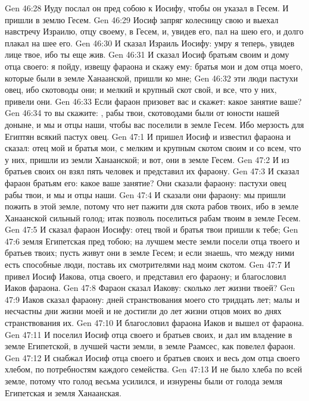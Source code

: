 \vs Gen 46:28 Иуду послал он пред собою к Иосифу, чтобы он указал  в Гесем. И пришли в землю Гесем.
\vs Gen 46:29 Иосиф запряг колесницу свою и выехал навстречу Израилю, отцу своему, в Гесем, и, увидев его, пал на шею его, и долго плакал на шее его.
\vs Gen 46:30 И сказал Израиль Иосифу: умру я теперь, увидев лице твое, ибо ты еще жив.
\vs Gen 46:31 И сказал Иосиф братьям своим и дому отца своего: я пойду, извещу фараона и скажу ему: братья мои и дом отца моего, которые были в земле Ханаанской, пришли ко мне;
\vs Gen 46:32 эти люди пастухи овец, ибо скотоводы они; и мелкий и крупный скот свой, и все, что у них, привели они.
\vs Gen 46:33 Если фараон призовет вас и скажет: какое занятие ваше?
\vs Gen 46:34 то вы скажите: , рабы твои, скотоводами были от юности нашей доныне, и мы и отцы наши, чтобы вас поселили в земле Гесем. Ибо мерзость для Египтян всякий пастух овец.
\vs Gen 47:1 И пришел Иосиф и известил фараона и сказал: отец мой и братья мои, с мелким и крупным скотом своим и со всем, что у них, пришли из земли Ханаанской; и вот, они в земле Гесем.
\vs Gen 47:2 И из братьев своих он взял пять человек и представил их фараону.
\vs Gen 47:3 И сказал фараон братьям его: какое ваше занятие? Они сказали фараону: пастухи овец рабы твои, и мы и отцы наши.
\vs Gen 47:4 И сказали они фараону: мы пришли пожить в этой земле, потому что нет пажити для скота рабов твоих, ибо в земле Ханаанской сильный голод; итак позволь поселиться рабам твоим в земле Гесем.
\vs Gen 47:5 И сказал фараон Иосифу: отец твой и братья твои пришли к тебе;
\vs Gen 47:6 земля Египетская пред тобою; на лучшем месте земли посели отца твоего и братьев твоих; пусть живут они в земле Гесем; и если знаешь, что между ними есть способные люди, поставь их смотрителями над моим скотом.
\vs Gen 47:7 И привел Иосиф Иакова, отца своего, и представил его фараону; и благословил Иаков фараона.
\vs Gen 47:8 Фараон сказал Иакову: сколько лет жизни твоей?
\vs Gen 47:9 Иаков сказал фараону: дней странствования моего сто тридцать лет; малы и несчастны дни жизни моей и не достигли до лет жизни отцов моих во днях странствования их.
\vs Gen 47:10 И благословил фараона Иаков и вышел от фараона.
\vs Gen 47:11 И поселил Иосиф отца своего и братьев своих, и дал им владение в земле Египетской, в лучшей части земли, в земле Раамсес, как повелел фараон.
\vs Gen 47:12 И снабжал Иосиф отца своего и братьев своих и весь дом отца своего хлебом, по потребностям каждого семейства.
\rsbpar\vs Gen 47:13 И не было хлеба по всей земле, потому что голод весьма усилился, и изнурены были от голода земля Египетская и земля Ханаанская.
